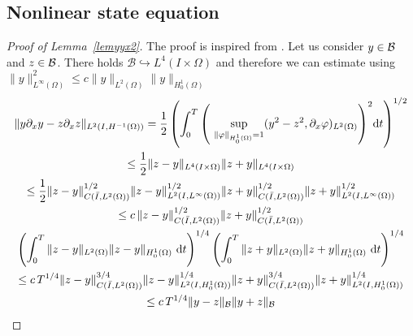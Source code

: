 \subsection{Nonlinear state equation}
\label{sec:nonl-state-equat}
\begin{proof}[Proof of Lemma~\ref{lemyyx2}] The proof is inspired from \cite[Theorem 2.8]{faminskii2010initial}. Let us consider $y \in \mathcal{B}$ and $z \in \mathcal{B}$. There holds $\mathcal B\hookrightarrow L^4(I\times \Omega)$ and therefore we can estimate using $\|y\|_{L^\infty(\Omega)}^2\leq c\|y\|_{L^2(\Omega)}\|y\|_{H^1_0(\Omega)}$
\begin{multline*}
\norm{y\partial_x y - z\partial_x z}_{\Hm1}= \frac 1 2\left(\int_0^T{\left(\ \sup_{\norm{\varphi}_{H^1_0(\Omega)} = 1}(y^2 -  z^2,\partial_x\varphi)_{L^2(\Omega)}\right)^2}\mathrm dt\right)^{1/2} \\
\leq \frac{1}{2}\norm{z-y}_{L^4(I\times \Omega)}\norm{z+y}_{L^4(I\times \Omega)}\\
\leq\frac{1}{2} \norm{z-y}_{C(\bar I,L^2(\Omega))}^{1/2}\norm{z-y}_{L^2(I,L^{\infty}(\Omega))}^{1/2}\norm{z+y}_{C(\bar I,L^2(\Omega))}^{1/2}\norm{z+y}_{L^2(I,L^{\infty}(\Omega))}^{1/2}\\
\leq c\, \norm{z-y}_{C(\bar I,L^2(\Omega))}^{1/2}\norm{z+y}_{C(\bar I,L^2(\Omega))}^{1/2}\\
\left(\int_0^T{ \norm{z-y}_{L^2(\Omega)}\norm{z-y}_{H^1_0(\Omega)}~\mathrm dt}\right)^{1/4}\left(\int_0^T{ \norm{z+y}_{L^2(\Omega)}\norm{z+y}_{H^1_0(\Omega)}~\mathrm dt}\right)^{1/4}\\
\leq c \,T^{1/4}\norm{z-y}_{C(\bar I,L^2(\Omega))}^{3/4}\norm{z-y}_{L^2(I,H^1_0(\Omega))}^{1/4}\norm{z+y}_{C(\bar I,L^2(\Omega))}^{3/4}\norm{z+y}_{L^2(I,H^1_0(\Omega))}^{1/4} \\
\leq c \,T^{1/4}\norm{y-z}_{\B}\norm{y+z}_{\B}
\end{multline*}
\qquad\end{proof}


